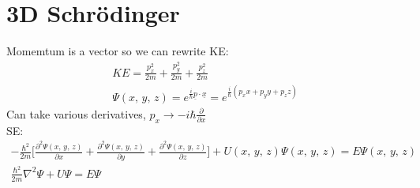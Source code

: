 \documentclass[a4paper, 11pt, fleqn, normalem]{report}
\begin{document}
\section{3D Schr\"{o}dinger}
Momemtum is a vector so we can rewrite KE:
\begin{gather*}
    KE = \frac{p_{x}^{2}}{2m} + \frac{p_{y}^{2}}{2m} + \frac{p_{z}^{2}}{2m} \\
    \Psi(x,\,y,\,z) = e^{\tfrac{i}{\hbar}\underline{p}\cdot\underline{x}} = e^{\tfrac{i}{\hbar}(p_{x}x + p_{y}y + p_{z}z)}
\end{gather*}
Can take various derivatives, $p_{x} \rightarrow -i\hbar\frac{\partial}{\partial x}$ \\
SE:
\begin{gather*}
    -\frac{\hbar^{2}}{2m}\Bigg[\frac{\partial^{2}\Psi(x,\,y,\,z)}{\partial x} + \frac{\partial^{2}\Psi(x,\,y,\,z)}{\partial y} + \frac{\partial^{2}\Psi(x,\,y,\,z)}{\partial z}\Bigg] + U(x,\,y,\,z)\Psi(x,\,y,\,z) = E\Psi(x,\,y,\,z) \\
    \frac{\hbar^{2}}{2m}\nabla^{2}\Psi + U\Psi = E\Psi
\end{gather*}
\end{document}
